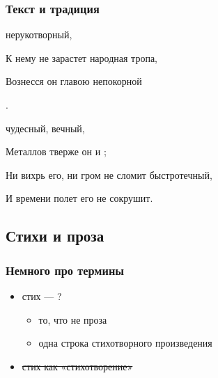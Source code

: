 \documentclass{beamer}
\begin{document}

\begin{frame}
\frametitle{Текст и традиция}

\color{red}{Я памятник себе воздвиг} \color{black}нерукотворный,

К нему не зарастет народная тропа,

Вознесся \color{green}{выше} \color{black}он главою непокорной

\color{green}{Александрийского столпа}.

\begin{flushleft}
\color{black}{\large vs.}
\end{flushleft}

\color{red}{Я памятник себе воздвиг} \color{black}чудесный, вечный,

Металлов тверже он и \color{green}{выше пирамид};

\color{black}Ни вихрь его, ни гром не сломит быстротечный,

И времени полет его не сокрушит.


\end{frame}


\subsection{Стихи и проза}\label{sec:diff}


\begin{frame}
\frametitle{Немного про термины}
\begin{itemize}
\item стих — ? 
\begin{itemize}
\item то, что не проза
\item одна строка стихотворного произведения
\end{itemize}
\item \sout{стих как «стихотворение»}
\end{itemize}
\end{frame}

\end{document}
